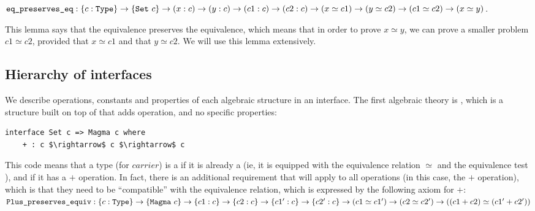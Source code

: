 ${\mbox{\texttt{eq\_preserves\_eq}}} : \{c:{\mbox{\texttt{Type}}}\} \rightarrow \{{\mbox{\texttt{Set}}}\ c\} \rightarrow (x:c) \rightarrow (y:c) \rightarrow (c1:c) \rightarrow (c2:c) \rightarrow (x \simeq c1) \rightarrow (y \simeq c2) \rightarrow (c1 \simeq c2) \rightarrow (x \simeq y)$.





This lemma says that the equivalence preserves the equivalence, which means
that in order to prove $x \simeq y$, we can prove a smaller
problem $c1 \simeq c2$, provided that $x \simeq c1$ and that $y \simeq c2$.
We will use this lemma extensively.

\subsection{Hierarchy of interfaces}

We describe operations, constants and properties of each algebraic structure 
in an interface. The first algebraic theory is , which is a structure built on top of  that adds
 operation, and no specific properties:

\begin{lstlisting}
interface Set c => Magma c where
    + : c $\rightarrow$ c $\rightarrow$ c
\end{lstlisting}

This code means that a type  (for $carrier$) is a  if it is
already a  (ie, it is equipped with the equivalence relation $\simeq$
and the equivalence test ), and if it has a $+$ operation.  In
fact, there is an additional requirement that will apply to all operations (in
this case, the $+$ operation), which is that they need to be ``compatible'' with
the equivalence relation, which is expressed by the following axiom for $+$:
\\ ${\mbox{\texttt{Plus\_preserves\_equiv}}} : \{c:{\mbox{\texttt{Type}}}\} \rightarrow
\{{\mbox{\texttt{Magma}}}\ c\} \rightarrow\{c1:c\} \rightarrow \{c2:c\} \rightarrow
\{c1':c\} \rightarrow \{c2':c\} \rightarrow (c1 \simeq c1') \rightarrow (c2
\simeq c2') \rightarrow ((c1+c2) \simeq (c1'+c2'))$ 

